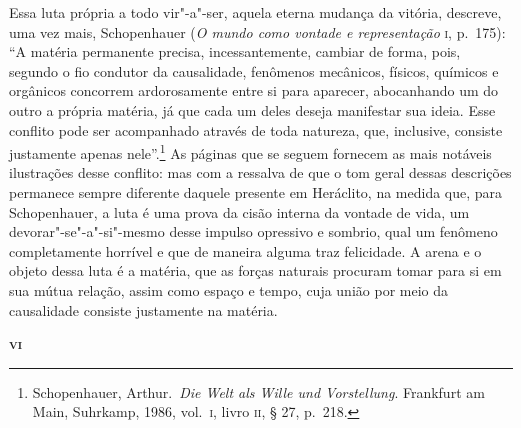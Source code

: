 Essa luta própria a todo vir"-a"-ser, aquela eterna mudança da vitória,
descreve, uma vez mais, Schopenhauer (\textit{O mundo como vontade e
representação} \textsc{i}, p.~175): ``A matéria permanente precisa,
incessantemente, cambiar de forma, pois, segundo o fio condutor da
causalidade, fenômenos mecânicos, físicos, químicos e orgânicos concorrem
ardorosamente entre si para aparecer, abocanhando um do outro a própria
matéria, já que cada um deles deseja manifestar sua ideia. Esse conflito pode
ser acompanhado através de toda natureza, que, inclusive, consiste justamente
apenas nele''.\footnote{ Schopenhauer, Arthur.~\textit{Die Welt als Wille und
Vorstellung}. Frankfurt am Main, Suhrkamp, 1986, vol.~\textsc{i}, livro \textsc{ii}, 
§ 27, p.~218.} As páginas que se seguem fornecem as mais notáveis ilustrações 
desse conflito: mas com a ressalva de que o tom geral dessas descrições permanece 
sempre diferente daquele presente em Heráclito, na medida que, para Schopenhauer, 
a luta é uma prova da cisão interna da vontade de vida, um devorar"-se"-a"-si"-mesmo 
desse impulso opressivo e sombrio, qual um fenômeno completamente horrível e que de maneira
alguma traz felicidade. A arena e o objeto dessa luta é a matéria, que as forças naturais 
procuram tomar para si em sua mútua relação, assim como espaço e tempo, cuja união por 
meio da causalidade consiste justamente na matéria. 

\bigskip
\textsc{\textbf{vi}}
\bigskip

